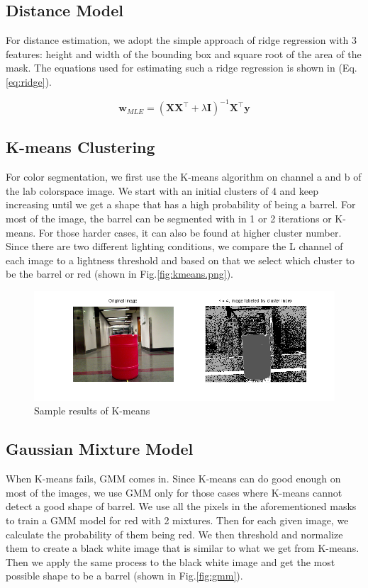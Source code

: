 \documentclass[twoside]{article}
\begin{document}
\begin{multicols}{2}
\subsection{Distance Model}
For distance estimation, we adopt the simple approach of ridge regression with 3 features: height and width of the bounding box and square root of the area of the mask. The equations used for estimating such a ridge regression is shown in (Eq.\ref{eq:ridge}).

\begin{equation}
\mathbf{w}_{MLE} = (\mathbf{X}\mathbf{X}^\top + \lambda \mathbf{I})^{-1}\mathbf{X}^\top \mathbf{y}
\label{eq:ridge}
\end{equation}

\subsection{K-means Clustering}
For color segmentation, we first use the K-means algorithm on channel a and b of the lab colorspace image. We start with an initial clusters of 4 and keep increasing until we get a shape that has a high probability of being a barrel. For most of the image, the barrel can be segmented with in 1 or 2 iterations or K-means. For those harder cases, it can also be found at higher cluster number. Since there are two different lighting conditions, we compare the L channel of each image to a lightness threshold and based on that we select which cluster to be the barrel or red (shown in Fig.\ref{fig:kmeans.png}).

\begin{figure}[H]
  \centering
  \includegraphics[width=\columnwidth]{kmeans.png}
    \caption{Sample results of K-means}
    \label{fig:kmeans}
\end{figure}

\subsection{Gaussian Mixture Model}
When K-means fails, GMM comes in. Since K-means can do good enough on most of the images, we use GMM only for those cases where K-means cannot detect a good shape of barrel. We use all the pixels in the aforementioned masks to train a GMM model for red with 2 mixtures. Then for each given image, we calculate the probability of them being red. We then threshold and normalize them to create a black white image that is similar to what we get from K-means. Then we apply the same process to the black white image and get the most possible shape to be a barrel (shown in Fig.\ref{fig:gmm}).


\end{multicols}
\end{document}
